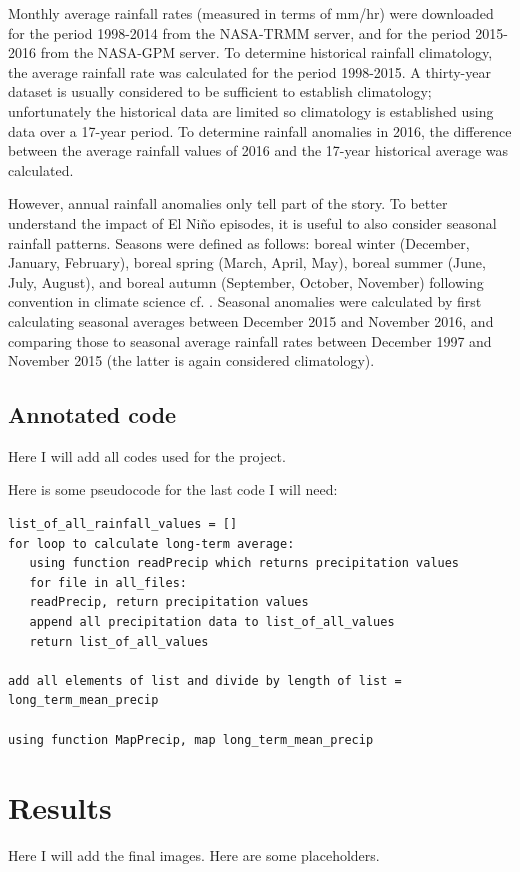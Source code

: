 \documentclass[12pt]{article}
\begin{document}
Monthly average rainfall rates (measured in terms of mm/hr) were downloaded for the period 1998-2014 from the NASA-TRMM server, and for the period 2015-2016 from the NASA-GPM server. To determine historical rainfall climatology, the average rainfall rate was calculated for the period 1998-2015. A thirty-year dataset is usually considered to be sufficient to establish climatology; unfortunately the historical data are limited so climatology is established using data over a 17-year period. To determine rainfall anomalies in 2016, the difference between the average rainfall values of 2016 and the 17-year historical average was calculated.

However, annual rainfall anomalies only tell part of the story. To better understand the impact of El Ni{\~n}o episodes, it is useful to also consider seasonal rainfall patterns. Seasons were defined as follows: boreal winter (December, January, February), boreal spring (March, April, May), boreal summer (June, July, August), and boreal autumn (September, October, November) following convention in climate science cf. \cite{larkin2005global}. Seasonal anomalies were calculated by first calculating seasonal averages between December 2015 and November 2016, and comparing those to seasonal average rainfall rates between December 1997 and November 2015 (the latter is again considered climatology).      
 
\subsection{Annotated code}
Here I will add all codes used for the project.

Here is some pseudocode for the last code I will need:

\begin{verbatim}
list_of_all_rainfall_values = []
for loop to calculate long-term average:
   using function readPrecip which returns precipitation values
   for file in all_files:
   readPrecip, return precipitation values
   append all precipitation data to list_of_all_values
   return list_of_all_values

add all elements of list and divide by length of list = long_term_mean_precip

using function MapPrecip, map long_term_mean_precip
\end{verbatim}

\section{Results}
Here I will add the final images. Here are some placeholders.
\end{document}
